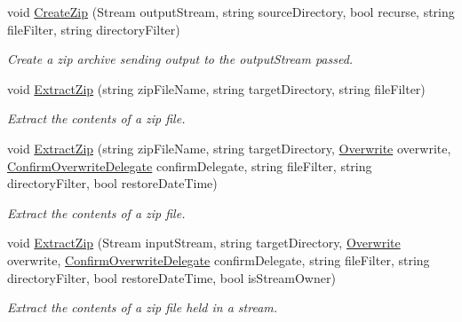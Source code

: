 \begin{DoxyCompactItemize}
void \hyperlink{class_i_c_sharp_code_1_1_sharp_zip_lib_1_1_zip_1_1_fast_zip_a097f0855d3b6146e5df00e5f0f07d094}{Create\+Zip} (Stream output\+Stream, string source\+Directory, bool recurse, string file\+Filter, string directory\+Filter)
\begin{DoxyCompactList}\small\item\em Create a zip archive sending output to the {\itshape output\+Stream}  passed. \end{DoxyCompactList}\item 
void \hyperlink{class_i_c_sharp_code_1_1_sharp_zip_lib_1_1_zip_1_1_fast_zip_a70117d25447e6611c4d84df937ccc59b}{Extract\+Zip} (string zip\+File\+Name, string target\+Directory, string file\+Filter)
\begin{DoxyCompactList}\small\item\em Extract the contents of a zip file. \end{DoxyCompactList}\item 
void \hyperlink{class_i_c_sharp_code_1_1_sharp_zip_lib_1_1_zip_1_1_fast_zip_aaec70f7d956a0fe5ae4f42436b85769d}{Extract\+Zip} (string zip\+File\+Name, string target\+Directory, \hyperlink{class_i_c_sharp_code_1_1_sharp_zip_lib_1_1_zip_1_1_fast_zip_a9befc960dd9a0ca2645a8677f77f6e8c}{Overwrite} overwrite, \hyperlink{class_i_c_sharp_code_1_1_sharp_zip_lib_1_1_zip_1_1_fast_zip_ac6c1d642626ec6123c60822e3e731b24}{Confirm\+Overwrite\+Delegate} confirm\+Delegate, string file\+Filter, string directory\+Filter, bool restore\+Date\+Time)
\begin{DoxyCompactList}\small\item\em Extract the contents of a zip file. \end{DoxyCompactList}\item 
void \hyperlink{class_i_c_sharp_code_1_1_sharp_zip_lib_1_1_zip_1_1_fast_zip_a0bfd2a814499534178963434774c4892}{Extract\+Zip} (Stream input\+Stream, string target\+Directory, \hyperlink{class_i_c_sharp_code_1_1_sharp_zip_lib_1_1_zip_1_1_fast_zip_a9befc960dd9a0ca2645a8677f77f6e8c}{Overwrite} overwrite, \hyperlink{class_i_c_sharp_code_1_1_sharp_zip_lib_1_1_zip_1_1_fast_zip_ac6c1d642626ec6123c60822e3e731b24}{Confirm\+Overwrite\+Delegate} confirm\+Delegate, string file\+Filter, string directory\+Filter, bool restore\+Date\+Time, bool is\+Stream\+Owner)
\begin{DoxyCompactList}\small\item\em Extract the contents of a zip file held in a stream. \end{DoxyCompactList}\end{DoxyCompactItemize}
